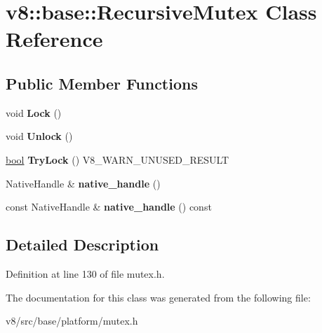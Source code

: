 \hypertarget{classv8_1_1base_1_1RecursiveMutex}{}\section{v8\+:\+:base\+:\+:Recursive\+Mutex Class Reference}
\label{classv8_1_1base_1_1RecursiveMutex}
\subsection*{Public Member Functions}
\begin{DoxyCompactItemize}
\item 
\mbox{\label{classv8_1_1base_1_1RecursiveMutex_a37a8771b715dac556b099bd4f90a5e12}} 
void {\bfseries Lock} ()
\item 
\mbox{\label{classv8_1_1base_1_1RecursiveMutex_a7b1000f25567ddf72687c1b77426dd18}} 
void {\bfseries Unlock} ()
\item 
\mbox{\label{classv8_1_1base_1_1RecursiveMutex_a89d4edea230fbbc34089442fdd68cff5}} 
\mbox{\hyperlink{classbool}{bool}} {\bfseries Try\+Lock} () V8\+\_\+\+W\+A\+R\+N\+\_\+\+U\+N\+U\+S\+E\+D\+\_\+\+R\+E\+S\+U\+LT
\item 
\mbox{\label{classv8_1_1base_1_1RecursiveMutex_a42a062720a68510d37769b680b9ac4cb}} 
Native\+Handle \& {\bfseries native\+\_\+handle} ()
\item 
\mbox{\label{classv8_1_1base_1_1RecursiveMutex_a1b9787de1ae4977ef0b58b7024ede706}} 
const Native\+Handle \& {\bfseries native\+\_\+handle} () const
\end{DoxyCompactItemize}


\subsection{Detailed Description}


Definition at line 130 of file mutex.\+h.



The documentation for this class was generated from the following file\+:\begin{DoxyCompactItemize}
\item 
v8/src/base/platform/mutex.\+h\end{DoxyCompactItemize}
